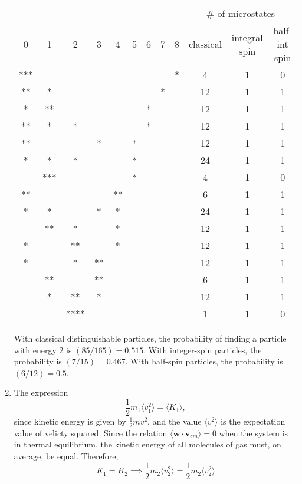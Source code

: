 \documentclass[10pt]{article}
\renewcommand{\vec}{\mathbf}
\begin{document}
\begin{enumerate}
    \begin{tabular}{cccccccccccc}
        \hline \hline
        \multicolumn{9}{c}{} & \multicolumn{3}{c}{\# of microstates} \\
        0 & 1 & 2 & 3 & 4 & 5 & 6 & 7 & 8 & classical & integral spin & half-int spin\\ \hline
        *** & & & & & & & & * & 4 & 1 & 0\\
        ** & * & & & & & & * & & 12 & 1 & 1 \\
        * & ** &  & & & & * & & & 12 & 1 & 1 \\
        ** & * & * & & & & * & & & 12 & 1 & 1 \\
        ** & & & * & & * & & & & 12 & 1 & 1\\
        * & * & * & & & * & & & & 24 & 1 & 1\\
          & *** & & & & * & & & & 4 & 1 & 0\\
        ** & & & & ** & & & & & 6 & 1 & 1\\
        * & * & & * & * & & & & & 24 & 1 & 1\\
          & ** & * & & * & & & & & 12 & 1 & 1\\
        * & & ** & & * & & & & & 12 & 1 & 1\\
        * & & * & ** & & & & & & 12 & 1 & 1\\
         & ** & & ** & & & & & & 6 & 1 & 1\\
        & * & ** & * & & & & & & 12 & 1 & 1\\
         & & **** & & & & & & & 1 & 1 & 0\\ \hline \hline
    \end{tabular}

    With classical distinguishable particles, the probability of finding a particle with energy 2 is $(85/165) = 0.515$. With integer-spin particles, the probability is $(7/15) = 0.467$. With half-spin particles, the probability is $(6/12) = 0.5$.

    \item The expression
    \begin{equation*}
        \frac{1}{2}m_1 \langle v_1^2 \rangle = \langle K_1 \rangle,
    \end{equation*}
    since kinetic energy is given by $\frac{1}{2}mv^2$, and the value $\langle v^2 \rangle$ is the expectation value of velicty squared. Since the relation $\langle \vec{w}\cdot \vec{v}_{cm} \rangle = 0$ when the system is in thermal equilibrium, the kinetic energy of all molecules of gas must, on average, be equal. Therefore,
    \begin{equation*}
        K_1 = K_2 \implies \frac{1}{2}m_2 \langle v_2^2 \rangle = \frac{1}{2}m_2 \langle v_2^2 \rangle
    \end{equation*}


\end{enumerate}
\end{document}
